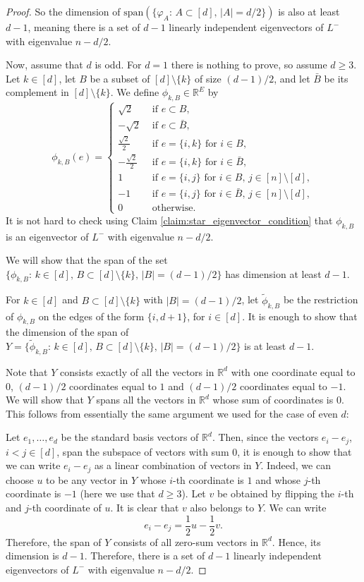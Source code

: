 \documentclass[a4paper,11pt]{article}
\theoremstyle{plain}
\theoremstyle{definition}
\newcommand{\Rea}{{\mathbb R}}
\begin{document}
\begin{proof}
So the dimension of $\text{span}(\{\varphi_A:\, A\subset[d],\, |A|=d/2\})$ is also at least $d-1$, meaning there is a set of $d-1$ linearly independent eigenvectors of $L^-$ with eigenvalue $n-d/2$.


Now, assume that $d$ is odd. For $d=1$ there is nothing to prove, so assume $d\ge 3$. Let $k\in[d]$, let $B$ be a subset of $[d]\setminus\{k\}$ of size $(d-1)/2$, and let $\bar{B}$ be its complement in $[d]\setminus\{k\}$. We define $\phi_{k,B}\in \Rea^E$ by
\[
\phi_{k,B}(e)=\begin{cases}
            \sqrt{2} & \text { if } e\subset B,\\
            -\sqrt{2} & \text{ if } e\subset \bar{B},\\
     \frac{\sqrt{2}}{2} & \text{ if } e=\{i,k\} \text{ for } i\in B,\\
 -\frac{\sqrt{2}}{2} & \text{ if } e=\{i,k\} \text{ for } i\in\bar{B},\\
 1 & \text{ if } e=\{i,j\} \text{ for } i\in B,\, j\in [n]\setminus[d],\\
             -1 & \text{ if } e=\{i,j\} \text{ for } i\in \bar{B},\, j\in [n]\setminus[d],\\
           0 & \text{ otherwise.}  
\end{cases}
\]
It is not hard to check using Claim \ref{claim:star_eigenvector_condition} that $\phi_{k,B}$ is an eigenvector of $L^-$ with eigenvalue $n-d/2$.

We will show that the span of the set $\{\phi_{k,B}:\, k\in[d],\,  B\subset[d]\setminus\{k\},\, |B|=(d-1)/2\}$ has dimension at least $d-1$.

For $k\in [d]$ and $B\subset [d]\setminus\{k\}$ with  $|B|=(d-1)/2$, let $\tilde{\phi}_{k,B}$ be the restriction of $\phi_{k,B}$ on the edges of the form $\{i,d+1\}$, for $i\in[d]$. It is enough to show that the dimension of the span of $Y=\{\tilde{\phi}_{k,B}:\, k\in [d], \, B\subset [d]\setminus\{k\}, \,  |B|=(d-1)/2\}$ is at least $d-1$. 

Note that $Y$ consists exactly of all the vectors in $\Rea^d$ with one coordinate equal to $0$, $(d-1)/2$ coordinates equal to $1$ and $(d-1)/2$ coordinates equal to $-1$.
 We will show that $Y$ spans all the vectors in $\Rea^d$ whose sum of coordinates is $0$. This follows from essentially the same argument we used for the case of even $d$:
 
 Let $e_1,\ldots,e_d$ be the standard basis vectors of $\Rea^d$. Then, since the vectors $e_i-e_j$, $i<j\in[d]$, span the subspace of vectors with sum $0$, it is enough to show that we can write $e_i-e_j$ as a linear combination of vectors in $Y$. Indeed, we can choose $u$ to be any vector in $Y$ whose $i$-th coordinate is $1$ and whose $j$-th coordinate is $-1$ (here we use that $d\geq 3$). Let $v$ be obtained by flipping the $i$-th and $j$-th coordinate of $u$. It is clear that $v$ also belongs to $Y$. We can write
\[
e_i-e_j=\frac{1}{2}u-\frac{1}{2}v.
\]  
Therefore, the span of $Y$ consists of all zero-sum vectors in $\Rea^d$. Hence, its dimension is $d-1$. Therefore, there is a set of $d-1$ linearly independent eigenvectors of $L^-$ with eigenvalue $n-d/2$.



\end{proof}
\end{document}
